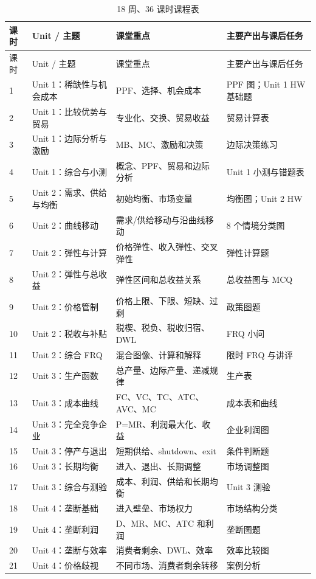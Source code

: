 \documentclass[11pt,a4paper]{ctexart}
\begin{document}
\small
\begin{longtable}{p{0.8cm}p{2.7cm}p{5.2cm}p{4.2cm}}
\caption{18 周、36 课时课程表}\\
\toprule
课时 & Unit / 主题 & 课堂重点 & 主要产出与课后任务\\
\midrule
\endfirsthead
\toprule
课时 & Unit / 主题 & 课堂重点 & 主要产出与课后任务\\
\midrule
\endhead
1 & Unit 1：稀缺性与机会成本 & PPF、选择、机会成本 & PPF 图；Unit 1 HW 基础题\\
2 & Unit 1：比较优势与贸易 & 专业化、交换、贸易收益 & 贸易计算表\\
3 & Unit 1：边际分析与激励 & MB、MC、激励和决策 & 边际决策练习\\
4 & Unit 1：综合与小测 & 概念、PPF、贸易和边际分析 & Unit 1 小测与错题表\\
5 & Unit 2：需求、供给与均衡 & 初始均衡、市场变量 & 均衡图；Unit 2 HW\\
6 & Unit 2：曲线移动 & 需求/供给移动与沿曲线移动 & 8 个情境分类图\\
7 & Unit 2：弹性与计算 & 价格弹性、收入弹性、交叉弹性 & 弹性计算题\\
8 & Unit 2：弹性与总收益 & 弹性区间和总收益关系 & 总收益图与 MCQ\\
9 & Unit 2：价格管制 & 价格上限、下限、短缺、过剩 & 政策图题\\
10 & Unit 2：税收与补贴 & 税楔、税负、税收归宿、DWL & FRQ 小问\\
11 & Unit 2：综合 FRQ & 混合图像、计算和解释 & 限时 FRQ 与讲评\\
12 & Unit 3：生产函数 & 总产量、边际产量、递减规律 & 生产表\\
13 & Unit 3：成本曲线 & FC、VC、TC、ATC、AVC、MC & 成本表和曲线\\
14 & Unit 3：完全竞争企业 & P=MR、利润最大化、收益 & 企业利润图\\
15 & Unit 3：停产与退出 & 短期供给、shutdown、exit & 条件判断题\\
16 & Unit 3：长期均衡 & 进入、退出、长期调整 & 市场调整图\\
17 & Unit 3：综合与测验 & 成本、利润、供给和长期均衡 & Unit 3 测验\\
18 & Unit 4：垄断基础 & 进入壁垒、市场权力 & 市场结构分类\\
19 & Unit 4：垄断利润 & D、MR、MC、ATC 和利润 & 垄断图题\\
20 & Unit 4：垄断与效率 & 消费者剩余、DWL、效率 & 效率比较图\\
21 & Unit 4：价格歧视 & 不同市场、消费者剩余转移 & 案例分析\\

\end{longtable}
\end{document}
